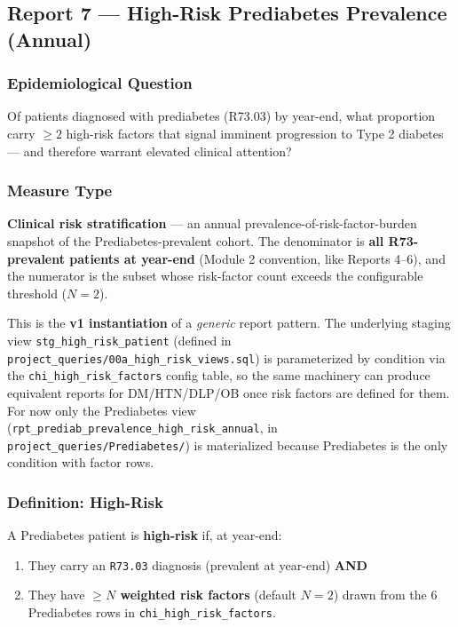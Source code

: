 \documentclass[11pt,a4paper]{article}
\begin{document}
\subsection{Report 7 --- High-Risk Prediabetes Prevalence (Annual)}

\subsubsection{Epidemiological Question}
Of patients diagnosed with prediabetes (R73.03) by year-end, what proportion carry $\geq 2$ high-risk factors that signal imminent progression to Type 2 diabetes --- and therefore warrant elevated clinical attention?

\subsubsection{Measure Type}
\textbf{Clinical risk stratification} --- an annual prevalence-of-risk-factor-burden snapshot of the Prediabetes-prevalent cohort. The denominator is \textbf{all R73-prevalent patients at year-end} (Module 2 convention, like Reports 4--6), and the numerator is the subset whose risk-factor count exceeds the configurable threshold ($N = 2$).

This is the \textbf{v1 instantiation} of a \emph{generic} report pattern. The underlying staging view \texttt{stg\_high\_risk\_patient} (defined in \texttt{project\_queries/00a\_high\_risk\_views.sql}) is parameterized by condition via the \texttt{chi\_high\_risk\_factors} config table, so the same machinery can produce equivalent reports for DM/HTN/DLP/OB once risk factors are defined for them. For now only the Prediabetes view (\texttt{rpt\_prediab\_prevalence\_high\_risk\_annual}, in \texttt{project\_queries/Prediabetes/}) is materialized because Prediabetes is the only condition with factor rows.

\subsubsection{Definition: High-Risk}
A Prediabetes patient is \textbf{high-risk} if, at year-end:
\begin{enumerate}[leftmargin=*]
    \item They carry an \texttt{R73.03} diagnosis (prevalent at year-end) \textbf{AND}
    \item They have \textbf{$\geq N$ weighted risk factors} (default $N = 2$) drawn from the 6 Prediabetes rows in \texttt{chi\_high\_risk\_factors}.
\end{enumerate}
\end{document}
